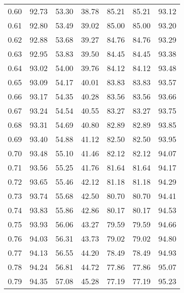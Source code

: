 \begin{tabular}{|c|c|c|c|c|c|c|}
      0.60 &     92.73 &     53.30 &      38.78 &   85.21 &      85.21 &         93.12 \\
      0.61 &     92.80 &     53.49 &      39.02 &   85.00 &      85.00 &         93.20 \\
      0.62 &     92.88 &     53.68 &      39.27 &   84.76 &      84.76 &         93.29 \\
      0.63 &     92.95 &     53.83 &      39.50 &   84.45 &      84.45 &         93.38 \\
      0.64 &     93.02 &     54.00 &      39.76 &   84.12 &      84.12 &         93.48 \\
      0.65 &     93.09 &     54.17 &      40.01 &   83.83 &      83.83 &         93.57 \\
      0.66 &     93.17 &     54.35 &      40.28 &   83.56 &      83.56 &         93.66 \\
      0.67 &     93.24 &     54.54 &      40.55 &   83.27 &      83.27 &         93.75 \\
      0.68 &     93.31 &     54.69 &      40.80 &   82.89 &      82.89 &         93.85 \\
      0.69 &     93.40 &     54.88 &      41.12 &   82.50 &      82.50 &         93.95 \\
      0.70 &     93.48 &     55.10 &      41.46 &   82.12 &      82.12 &         94.07 \\
      0.71 &     93.56 &     55.25 &      41.76 &   81.64 &      81.64 &         94.17 \\
      0.72 &     93.65 &     55.46 &      42.12 &   81.18 &      81.18 &         94.29 \\
      0.73 &     93.74 &     55.68 &      42.50 &   80.70 &      80.70 &         94.41 \\
      0.74 &     93.83 &     55.86 &      42.86 &   80.17 &      80.17 &         94.53 \\
      0.75 &     93.93 &     56.06 &      43.27 &   79.59 &      79.59 &         94.66 \\
      0.76 &     94.03 &     56.31 &      43.73 &   79.02 &      79.02 &         94.80 \\
      0.77 &     94.13 &     56.55 &      44.20 &   78.49 &      78.49 &         94.93 \\
      0.78 &     94.24 &     56.81 &      44.72 &   77.86 &      77.86 &         95.07 \\
      0.79 &     94.35 &     57.08 &      45.28 &   77.19 &      77.19 &         95.23 \\

\end{tabular}
